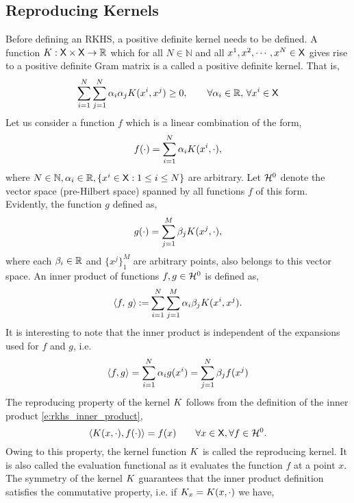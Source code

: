 \subsection{Reproducing Kernels} 
Before defining an RKHS, a positive definite kernel needs to be defined. A function $K : {\sf X} \times {\sf X} \to \mathbb{R}$ which for all $N \in \mathbb{N}$ and all $x^1,x^2,\cdots,x^N \in {\sf X}$ gives rise to a positive definite Gram matrix is a called a positive definite kernel. That is, 
\begin{equation}
\sum_{i=1}^N \sum_{j=1}^N \alpha_i \alpha_j K(x^i,x^j) \geq 0, \qquad \forall \alpha_i \in \mathbb{R}, \, \forall x^i \in {\sf X} 
\end{equation}
Let us consider a function $f$ which is a linear combination of the form,
\begin{equation}
f(\cdot) = \sum_{i=1}^N \alpha_i \Kern(x^i, \cdot),
\label{e:rkhs_f_rkhs}
\end{equation}
where $N \in \mathbb{N}, \alpha_i \in \mathbb{R}, \{ x^i \in {\sf X}: 1\leq i \leq N \}$ are arbitrary. Let ${\cal H}^0$ denote the vector space (pre-Hilbert space) spanned by all functions $f$ of this form. Evidently, the function $g$ defined as,  
\begin{equation}
g(\cdot) = \sum_{j=1}^M \rkhsparam_j \Kern(x^j, \cdot),
\label{e:rkhs_g_rkhs}
\end{equation}
where each $\beta_i \in \mathbb{R}$ and $\{x^j\}_1^M$ are arbitrary points, also belongs to this vector space.  An inner product of functions $f,g \in {\cal H}^0$ is defined as,
\begin{equation}
\langle f,\, g \rangle \eqdef \sum_{i=1}^N \sum_{j=1}^M \alpha_i \rkhsparam_j \Kern(x^i, x^j).
\label{e:rkhs_inner_product}
\end{equation}
It is interesting to note that the inner product is independent of the expansions used for $f$ and $g$, i.e.
\begin{equation}
\langle f, g \rangle = \sum_{i=1}^N \alpha_i g(x^i) = \sum_{j=1}^N \beta_j f(x^j)
\end{equation}
The reproducing property of the kernel $K$ follows from the definition of the inner product \eqref{e:rkhs_inner_product},
\begin{equation}
\langle \Kern(x,\cdot), f(\cdot)\rangle = f(x) \qquad \forall x \in \state, \forall f \in \clH^0.
\label{e:rkhs_rep_property}
\end{equation}
Owing to this property, the kernel function $K$ is called the reproducing kernel. It is also called the evaluation functional as it evaluates the function $f$ at a point $x$. The symmetry of the kernel $K$ guarantees that the inner product definition satisfies the commutative property, i.e. if $K_x = K(x, \cdot)$ we have,
